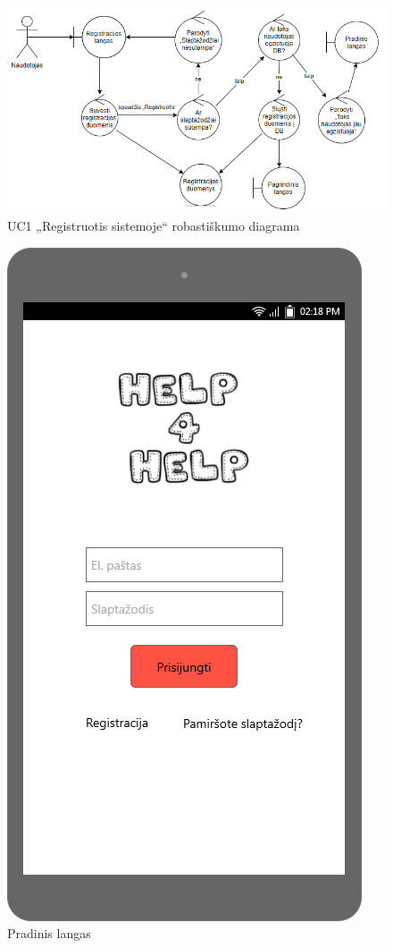 \documentclass{VUMIFPSbakalaurinis}
\begin{document}
\begin{figure}[H]
	\centering
	\includegraphics[scale=0.6]{img/Robustness/UC1}
	\caption{UC1 „Registruotis sistemoje“ robastiškumo diagrama}
	\label{img:uc1rob}
\end{figure}

\begin{figure}[H]
	\centering
	\includegraphics[scale=0.4]{img/ScreenShots/01-Pradinis-langas}
	\caption{Pradinis langas}
	\label{img:login}
\end{figure}
\end{document}
